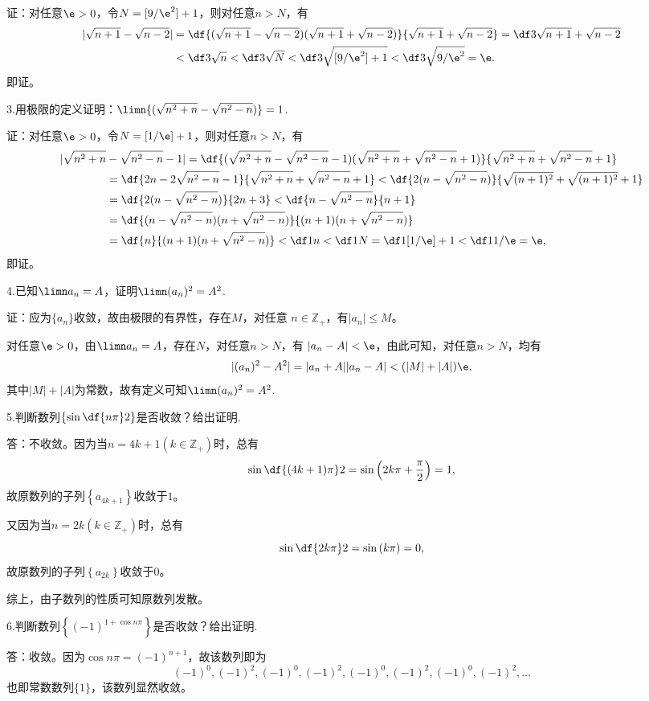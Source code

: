 证：对任意$\e>0$，令$N=[9/\e^2]+1$，则对任意$n>N$，有
\begin{align*}
	|\sqrt{n+1}-\sqrt{n-2}|
	&=\df{(\sqrt{n+1}-\sqrt{n-2})(\sqrt{n+1}+\sqrt{n-2})}
	{\sqrt{n+1}+\sqrt{n-2}}
	=\df3{\sqrt{n+1}+\sqrt{n-2}}\\
	&<\df3{\sqrt{n}}<\df3{\sqrt{N}}<\df3{\sqrt{[9/\e^2]+1}}
	<\df3{\sqrt{9/\e^2}}=\e.
\end{align*}
即证。\fin

\bs
3.用极限的定义证明：$\limn{(\sqrt{n^2+n}-\sqrt{n^2-n})}=1$.

证：对任意$\e>0$，令$N=[1/\e]+1$，则对任意$n>N$，有
\begin{align*}
	|\sqrt{n^2+n}&-\sqrt{n^2-n}-1|
	=\df{(\sqrt{n^2+n}-\sqrt{n^2-n}-1)(\sqrt{n^2+n}+\sqrt{n^2-n}+1)}
	{\sqrt{n^2+n}+\sqrt{n^2-n}+1}\\
	&=\df{2n-2\sqrt{n^2-n}-1}{\sqrt{n^2+n}+\sqrt{n^2-n}+1}
	<\df{2(n-\sqrt{n^2-n})}{\sqrt{(n+1)^2}+\sqrt{(n+1)^2}+1}\\
	&=\df{2(n-\sqrt{n^2-n})}{2n+3}
	<\df{n-\sqrt{n^2-n}}{n+1}\\
	&=\df{(n-\sqrt{n^2-n})(n+\sqrt{n^2-n})}{(n+1)(n+\sqrt{n^2-n})}\\
	&=\df{n}{(n+1)(n+\sqrt{n^2-n})}<\df1n<\df1N
	=\df1{[1/\e]+1}<\df1{1/\e}=\e,
\end{align*}
即证。\fin

\bs
4.已知$\limn a_n=A$，证明$\limn(a_n)^2=A^2$.

证：应为$\{a_n\}$收敛，故由极限的有界性，存在$M$，对任意
$n\in\mathbb{Z}_+$，有$|a_n|\leq M$。

对任意$\e>0$，由$\limn a_n=A$，存在$N$，对任意$n>N$，有
$|a_n-A|<\e$，由此可知，对任意$n>N$，均有
$$|(a_n)^2-A^2|=|a_n+A||a_n-A|<(|M|+|A|)\e,$$
其中$|M|+|A|$为常数，故有定义可知$\limn(a_n)^2=A^2$.
\fin

\bs
5.判断数列$\left\{\sin\df{n\pi}2\right\}$是否收敛？给出证明.

答：不收敛。因为当$n=4k+1(k\in\mathbb{Z}_+)$时，总有
$$\sin\df{(4k+1)\pi}2=\sin\left(2k\pi+\frac{\pi}2\right)=1,$$
故原数列的子列$\left\{a_{4k+1}\right\}$收敛于$1$。

又因为当$n=2k(k\in\mathbb{Z}_+)$时，总有
$$\sin\df{2k\pi}2=\sin\left(k\pi\right)=0,$$
故原数列的子列$\left\{a_{2k}\right\}$收敛于$0$。

综上，由子数列的性质可知原数列发散。\fin

\bs
6.判断数列$\left\{(-1)^{1+\cos n\pi}\right\}$是否收敛？给出证明.

答：收敛。因为$\cos n\pi=(-1)^{n+1}$，故该数列即为
$$(-1)^0,(-1)^2,(-1)^0,(-1)^2,(-1)^0,(-1)^2,(-1)^0,(-1)^2,\ldots$$
也即常数数列$\{1\}$，该数列显然收敛。\fin

